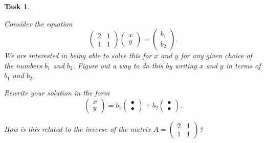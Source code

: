 \documentclass[10pt,]{book}
\theoremstyle{plain}
\numberwithin{equation}{section}
\newtheorem{task}{Task}[chapter]
\begin{document}
\begin{task}
\label{task-29}

          Consider the equation\[
            \begin{pmatrix} 2 & 1 \\ 1 & 1 \end{pmatrix}
            \begin{pmatrix} x \\ y \end{pmatrix} = \begin{pmatrix} b_1 \\ b_2
            \end{pmatrix}.
          \]
          We are interested in being able to solve this for \(x\) and \(y\)
          for any given choice of the numbers \(b_1\) and \(b_2\).
          Figure out a way to do this by writing \(x\) and \(y\) in terms
          of \(b_1\) and \(b_2\).
\par

          Rewrite your solution in the form\[
            \begin{pmatrix} x \\ y \end{pmatrix} = b_1 \begin{pmatrix}
            \bullet \\ \bullet\end{pmatrix} + b_2 \begin{pmatrix}  \bullet
            \\ \bullet \end{pmatrix}.
          \]
\par

          How is this related to the inverse of the matrix
          \(A = \left( \begin{smallmatrix} 2 & 1 \\ 1 & 1
          \end{smallmatrix} \right)\)?
\end{task}
\end{document}
